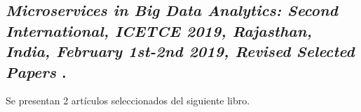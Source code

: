 
\subsection{
    \textbf{\emph{Microservices in Big Data Analytics: Second International, {ICETCE} 2019, Rajasthan, India, February 1st-2nd 2019, Revised Selected Papers}
    }
    \cite{chaudhary_microservices_2020}.
}

Se presentan 2 artículos seleccionados del siguiente libro.\par



